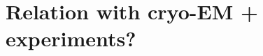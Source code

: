 \documentclass[12pt]{article}
\newcommand{\1}{\mathbf{1}}
\theoremstyle{plain}
\theoremstyle{definition}
\theoremstyle{remark}
\theoremstyle{plain}
\theoremstyle{remark}
\theoremstyle{plain}
\theoremstyle{plain}
\begin{document}
\section{Relation with cryo-EM + experiments?}
%
%
%
%
\end{document}
